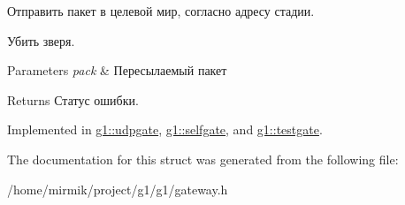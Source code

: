 Отправить пакет в целевой мир, согласно адресу стадии. 

Убить зверя. 
\begin{DoxyParams}{Parameters}
{\em pack} & Пересылаемый пакет \\
\hline
\end{DoxyParams}
\begin{DoxyReturn}{Returns}
Статус ошибки. 
\end{DoxyReturn}


Implemented in \hyperlink{structg1_1_1udpgate_ad0ae095fed19221c91dac452731235d7}{g1\+::udpgate}, \hyperlink{structg1_1_1selfgate_ac833bf5a5ef33393e889e910d1762b2c}{g1\+::selfgate}, and \hyperlink{structg1_1_1testgate_a1d66091483f19bc94ec975cbe3240789}{g1\+::testgate}.



The documentation for this struct was generated from the following file\+:\begin{DoxyCompactItemize}
\item 
/home/mirmik/project/g1/g1/gateway.\+h\end{DoxyCompactItemize}
